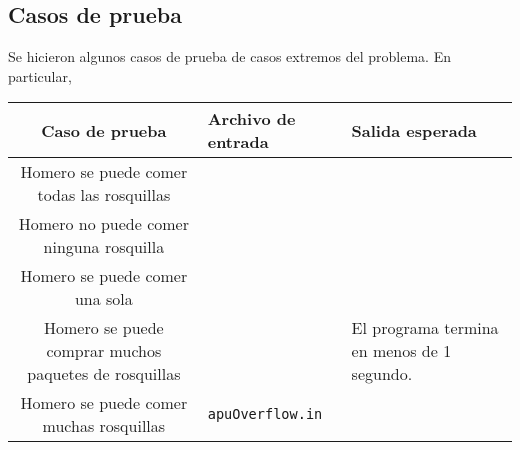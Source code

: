 

\newpage{}

\subsection{Casos de prueba}

Se hicieron algunos casos de prueba de casos extremos del problema. En particular,

\begin{flushleft}
\begin{tabulary}{\textwidth}{@{}|C|L|L|@{}}
\hline
\textbf{Caso de prueba} & \textbf{Archivo de entrada} & \textbf{Salida esperada} \\
\hline
Homero se puede comer todas las rosquillas &  &  \\
Homero no puede comer ninguna rosquilla &  &  \\
Homero se puede comer una sola &  &  \\
Homero se puede comprar muchos paquetes de rosquillas &  & El programa termina en menos de 1 segundo. \\
Homero se puede comer muchas rosquillas & \texttt{apuOverflow.in} &  \\
\hline
\end{tabulary}
\end{flushleft}
